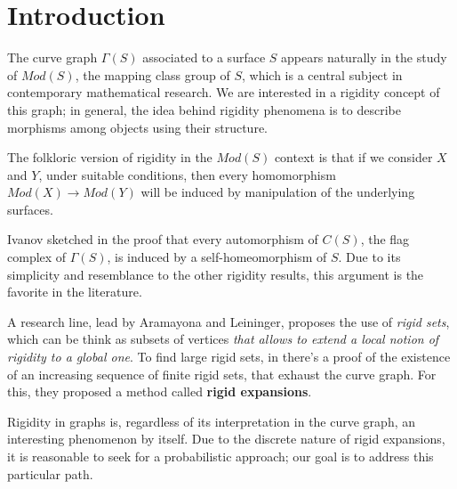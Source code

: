 \chapter*{Introduction} %

\label{Intro} %



The curve graph $\Gamma(S)$ associated to a surface $S$ appears naturally in the study of $Mod(S)$, the mapping class group of $S$, which is a central subject in contemporary mathematical research. We are interested in a rigidity concept of this graph; in general, the idea behind rigidity phenomena is to describe morphisms among objects using their structure.

The folkloric version of rigidity in the $Mod(S)$ context is that if we consider $X$ and $Y$, under suitable conditions, then every homomorphism $Mod(X) \to Mod(Y)$ will be induced by manipulation of the underlying surfaces.

Ivanov sketched in \cite[Ivanov 97]{celebratedIvanov} the proof that every automorphism of $C(S)$, the flag complex of $\Gamma(S)$, is induced by a self-homeomorphism of $S$. Due to its simplicity and resemblance to the other rigidity results, this argument is the favorite in the literature.

A research line, lead by Aramayona and Leininger, proposes the use of \textit{rigid sets}, which can be think as subsets of vertices \textit{that allows to extend a local notion of rigidity to a global one}. To find large rigid sets, in \cite[Aramayona, Leininger 16]{finiteRigidSetsJA} there's a proof of the existence of an increasing sequence of finite rigid sets, that exhaust the curve graph. For this, they proposed a method called \textbf{rigid expansions}.

Rigidity in graphs is, regardless of its interpretation in the curve graph, an interesting phenomenon by itself. Due to the discrete nature of rigid expansions, it is reasonable to seek for a probabilistic approach; our goal is to address this particular path.

